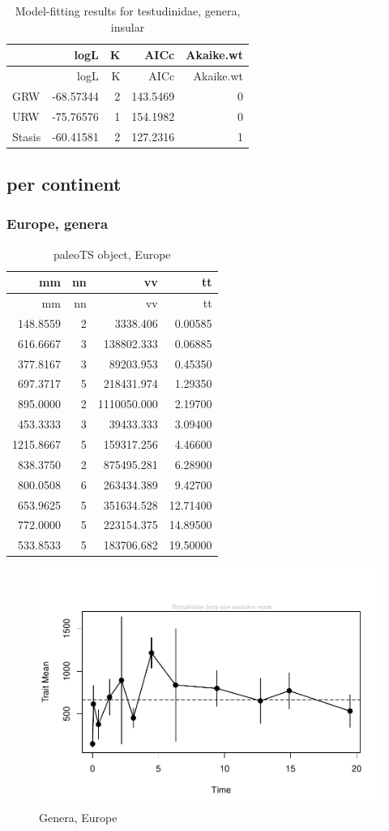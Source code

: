 \documentclass[]{article}
\begin{document}
\begin{longtable}[]{@{}lrrrr@{}}
\caption{Model-fitting results for testudinidae, genera,
insular}\tabularnewline
\toprule
& logL & K & AICc & Akaike.wt\tabularnewline
\midrule
\endfirsthead
\toprule
& logL & K & AICc & Akaike.wt\tabularnewline
\midrule
\endhead
GRW & -68.57344 & 2 & 143.5469 & 0\tabularnewline
URW & -75.76576 & 1 & 154.1982 & 0\tabularnewline
Stasis & -60.41581 & 2 & 127.2316 & 1\tabularnewline
\bottomrule
\end{longtable}

\newpage

\subsection{per continent}\label{per-continent}

\subsubsection{Europe, genera}\label{europe-genera}

\begin{longtable}[]{@{}rrrr@{}}
\caption{paleoTS object, Europe}\tabularnewline
\toprule
mm & nn & vv & tt\tabularnewline
\midrule
\endfirsthead
\toprule
mm & nn & vv & tt\tabularnewline
\midrule
\endhead
148.8559 & 2 & 3338.406 & 0.00585\tabularnewline
616.6667 & 3 & 138802.333 & 0.06885\tabularnewline
377.8167 & 3 & 89203.953 & 0.45350\tabularnewline
697.3717 & 5 & 218431.974 & 1.29350\tabularnewline
895.0000 & 2 & 1110050.000 & 2.19700\tabularnewline
453.3333 & 3 & 39433.333 & 3.09400\tabularnewline
1215.8667 & 5 & 159317.256 & 4.46600\tabularnewline
838.3750 & 2 & 875495.281 & 6.28900\tabularnewline
800.0508 & 6 & 263434.389 & 9.42700\tabularnewline
653.9625 & 5 & 351634.528 & 12.71400\tabularnewline
772.0000 & 5 & 223154.375 & 14.89500\tabularnewline
533.8533 & 5 & 183706.682 & 19.50000\tabularnewline
\bottomrule
\end{longtable}

\begin{figure}[htbp]
\centering
\includegraphics{MA_JJ_files/figure-latex/paleoTSEurope-1.pdf}
\caption{Genera, Europe}
\end{figure}
\end{document}
